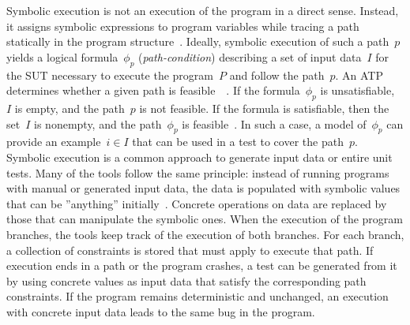 \documentclass{article}
\begin{document}
Symbolic execution is not an execution of the program in a direct sense. Instead, it assigns symbolic expressions to program variables while tracing a path statically in the program structure~\cite{McMinn_2004}. Ideally, symbolic execution of such a path~$p$ yields a logical formula~$\phi_{p}$ (\textit{path-condition}) describing a set of input data~$I$ for the \ac{SUT} necessary to execute the program~$P$ and follow the path~$p$. An \ac{ATP} determines whether a given path is feasible~~\cite{Clarke1976,King1976}. If the formula~$\phi_{p}$ is unsatisfiable, ~$I$ is empty, and the path~$p$ is not feasible. If the formula is satisfiable, then the set~$I$ is nonempty, and the path~$\phi_{p}$ is feasible~\cite{Ball2015}. In such a case, a model of~$\phi_{p}$ can provide an example~$i \in I$ that can be used in a test to cover the path~$p$. Symbolic execution is a common approach to generate input data or entire unit tests. Many of the tools follow the same principle: instead of running programs with manual or generated input data, the data is populated with symbolic values that can be ''anything'' initially~\cite{cadar2008klee}. Concrete operations on data are replaced by those that can manipulate the symbolic ones. When the execution of the program branches, the tools keep track of the execution of both branches. For each branch, a collection of constraints is stored that must apply to execute that path. If execution ends in a path or the program crashes, a test can be generated from it by using concrete values as input data that satisfy the corresponding path constraints. If the program remains deterministic and unchanged, an execution with concrete input data leads to the same bug in the program. 

\end{document}
